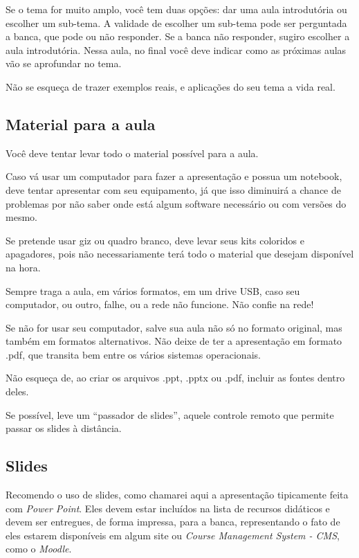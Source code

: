 \documentclass{article}
\begin{document}
Se o tema for muito amplo, você tem duas opções: dar uma aula introdutória ou escolher um sub-tema.
A validade de escolher um sub-tema pode ser perguntada a banca, que pode ou não responder.
Se a banca não responder, sugiro escolher a aula introdutória.
Nessa aula, no final você deve indicar como as próximas aulas vão se aprofundar no tema.

Não se esqueça de trazer exemplos reais, e aplicações do seu tema a vida real.



\subsection{Material para a aula}

Você deve tentar levar todo o material possível para a aula.

Caso vá usar um computador para fazer a apresentação e possua um notebook, deve tentar apresentar com seu equipamento, já que isso diminuirá a chance de problemas por não saber onde está algum software necessário ou com versões do mesmo.

Se pretende usar giz ou quadro branco, deve levar seus kits coloridos e apagadores, pois não necessariamente terá todo o material que desejam disponível na hora.


Sempre traga a aula, em vários formatos, em um drive USB, caso seu computador, ou outro, falhe, ou a rede não funcione. Não confie na rede!

Se não for usar seu computador, salve sua aula não só no formato original, mas também em formatos alternativos.
Não deixe de ter a apresentação em formato .pdf, que transita bem entre os vários sistemas operacionais.

Não esqueça de, ao criar os arquivos .ppt, .pptx ou .pdf, incluir as fontes dentro deles.

Se possível, leve um ``passador de slides'', aquele controle remoto que permite passar os slides à distância.

\subsection{Slides}

Recomendo o uso de slides, como chamarei aqui a apresentação tipicamente feita com \textit{Power Point}.
Eles devem estar incluídos na lista de recursos didáticos e devem ser entregues, de forma impressa, para a banca, representando o fato de eles estarem disponíveis em algum site ou \textit{Course Management System - CMS}, como o \textit{Moodle}.
\end{document}
